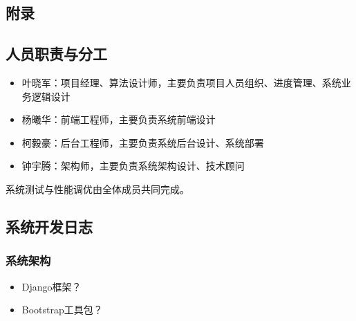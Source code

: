 \begin{center}
  \section{附录}
\end{center}

\subsection{人员职责与分工}
\begin{itemize}
  \item 叶晓军：项目经理、算法设计师，主要负责项目人员组织、进度管理、系统业务逻辑设计
  \item 杨曦华：前端工程师，主要负责系统前端设计
  \item 柯毅豪：后台工程师，主要负责系统后台设计、系统部署
  \item 钟宇腾：架构师，主要负责系统架构设计、技术顾问
\end{itemize}
系统测试与性能调优由全体成员共同完成。

\subsection{系统开发日志}
\subsubsection{系统架构}
\begin{itemize}
  \item Django框架？
  \item Bootstrap工具包？
\end{itemize}
